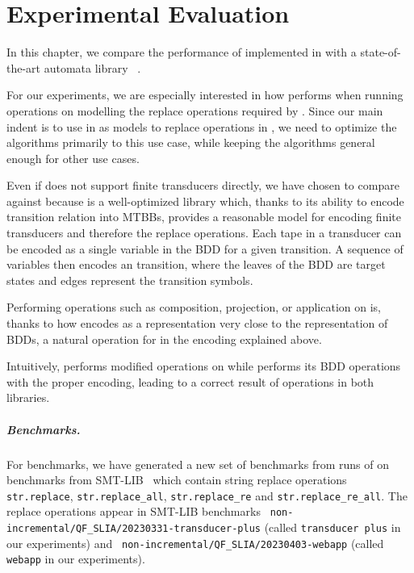 \chapter{Experimental Evaluation}

In this chapter, we compare the performance of \nfts implemented in \mata with a state-of-the-art automata library \mona~\cite{mona}.

For our experiments, we are especially interested in how \mata performs when running operations on \nfts modelling the replace operations required by \noodler.
Since our main indent is to use \nfts in \mata as models to replace operations in \noodler, we need to optimize the \nft algorithms primarily to this use case, while keeping the \nft algorithms general enough for other use cases.

Even if \mona does not support finite transducers directly, we have chosen \mona to compare \mata against because \mona is a well-optimized library which, thanks to its ability to encode transition relation into MTBBs, provides a reasonable model for encoding finite transducers and therefore the replace operations.
Each tape in a transducer can be encoded as a single variable in the BDD for a given transition.
A sequence of variables then encodes an \nft transition, where the leaves of the BDD are target states and edges represent the transition symbols.

Performing operations such as composition, projection, or application on \nfts is, thanks to how \mata encodes \nfts as a representation very close to the representation of BDDs, a natural operation for \mona in the encoding explained above.

Intuitively, \mata performs modified \nfa operations on \nfts while \mona performs its BDD operations with the proper encoding, leading to a correct result of \nft operations in both libraries.

\paragraph{Benchmarks.}

For benchmarks, we have generated a new set of benchmarks from runs of \noodler on benchmarks from SMT-LIB~\cite{SMTLIB} which contain string replace operations \texttt{str.replace}, \texttt{str.replace\_all}, \texttt{str.replace\_re} and \texttt{str.replace\_re\_all}.
The replace operations appear in SMT-LIB benchmarks \texttt{
non-incremental/QF\_SLIA/20230331-transducer-plus} (called \texttt{transducer plus} in our experiments) and \texttt{
non-incremental/QF\_SLIA/20230403-webapp} (called \texttt{webapp} in our experiments).

